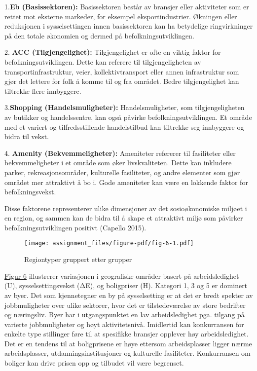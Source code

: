\documentclass[
  letterpaper,
  DIV=11,
  numbers=noendperiod]{scrartcl}
\begin{document}
1.\textbf{Eb (Basissektoren):} Basissektoren består av bransjer eller
aktiviteter som er rettet mot eksterne markeder, for eksempel
eksportindustrier. Økningen eller reduksjonen i sysselsettingen innen
basissektoren kan ha betydelige ringvirkninger på den totale økonomien
og dermed på befolkningsutviklingen.

2. \textbf{ACC (Tilgjengelighet):} Tilgjengelighet er ofte en viktig
faktor for befolkningsutviklingen. Dette kan referere til
tilgjengeligheten av transportinfrastruktur, veier, kollektivtransport
eller annen infrastruktur som gjør det lettere for folk å komme til og
fra området. Bedre tilgjengelighet kan tiltrekke flere innbyggere.

3.\textbf{Shopping (Handelsmuligheter):} Handelsmuligheter, som
tilgjengeligheten av butikker og handelssentre, kan også påvirke
befolkningsutviklingen. Et område med et variert og tilfredsstillende
handelstilbud kan tiltrekke seg innbyggere og bidra til vekst.

4. \textbf{Amenity (Bekvemmeligheter):} Ameniteter refererer til
fasiliteter eller bekvemmeligheter i et område som øker livskvaliteten.
Dette kan inkludere parker, rekreasjonsområder, kulturelle fasiliteter,
og andre elementer som gjør området mer attraktivt å bo i. Gode
ameniteter kan være en lokkende faktor for befolkningsvekst.

Disse faktorene representerer ulike dimensjoner av det sosioøkonomiske
miljøet i en region, og sammen kan de bidra til å skape et attraktivt
miljø som påvirker befolkningsutviklingen positivt (Capello 2015).

\begin{figure}

{\centering \texttt{[image: assignment\_files/figure-pdf/fig-6-1.pdf]}

}

\caption{\label{fig-6}Regiontyper gruppert etter grupper}

\end{figure}

\protect\hyperlink{fig-6}{Figur 6} illustrerer variasjonen i geografiske
områder basert på arbeidsledighet (U), sysselsettingsvekst (ΔE), og
boligpriser (H). Kategori 1, 3 og 5 er dominert av byer. Det som
kjennetegner en by på sysselsetting er at det er bredt spekter av
jobbmuligheter over ulike sektorer, hvor det er tilstedeværelse av store
bedrifter og næringsliv. Byer har i utgangspunktet en lav
arbeidsledighet pga. tilgang på varierte jobbmuligheter og høyt
aktivitetsnivå. Imidlertid kan konkurransen for enkelte type stillinger
føre til at spesifikke bransjer opplever høy arbeidsledighet. Det er en
tendens til at boligprisene er høye ettersom arbeidsplasser ligger nærme
arbeidsplasser, utdanningsinstitusjoner og kulturelle fasiliteter.
Konkurransen om boliger kan drive prisen opp og tilbudet vil være
begrenset.
\end{document}
